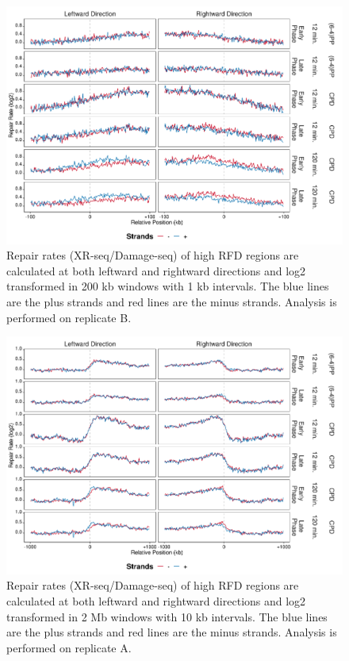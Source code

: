 \begin{figure}[H]
\begin{center}
\includegraphics[width=\textwidth]{Chapters/7_appendix/figures/supfig65}
\caption[Repair rate of high RFDs in 200 kb (replicate B).]{Repair rates (XR-seq/Damage-seq) of high RFD regions are calculated at both leftward and rightward directions and log2 transformed in 200 kb windows with 1 kb intervals. The blue lines are the plus strands and red lines are the minus strands. Analysis is performed on replicate B.}
\label{supfig:rr200rfdB}
\end{center}
\end{figure}

\begin{figure}[H]
\begin{center}
\includegraphics[width=\textwidth]{Chapters/7_appendix/figures/supfig66}
\caption[Repair rate of high RFDs in 2 Mb (replicate A).]{Repair rates (XR-seq/Damage-seq) of high RFD regions are calculated at both leftward and rightward directions and log2 transformed in 2 Mb windows with 10 kb intervals. The blue lines are the plus strands and red lines are the minus strands. Analysis is performed on replicate A.}
\label{supfig:rr2000rfdA}
\end{center}
\end{figure}

